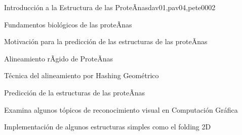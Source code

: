 \begin{syllabus}
\begin{unit}{Introducción a la Estructura de las ProteÃ­nas}{dav01,pav04,pete00}{0}{2}
\begin{topics}
        \item Fundamentos biológicos de las proteÃ­nas
        \item Motivación para la predicción de las estructuras de las proteÃ­nas
        \item Alineamiento rÃ­gido de ProteÃ­nas
        \item Técnica del alineamiento por Hashing Geométrico
        \item Predicción de la estructuras de las proteÃ­nas
    \end{topics}

    \begin{learningoutcomes}
        \item Examina algunos tópicos de reconocimiento visual en Computación Gráfica
        \item Implementación de algunos estructuras simples como el folding 2D
    \end{learningoutcomes}
\end{unit}



\begin{coursebibliography}
\end{coursebibliography}

\end{syllabus}
